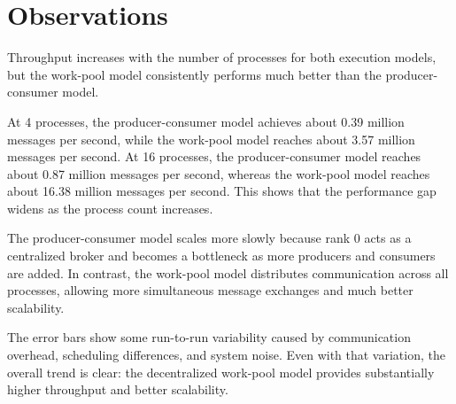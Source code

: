 \documentclass[11pt]{article}
\begin{document}
\section*{Observations}

Throughput increases with the number of processes for both execution models, but the work-pool model consistently performs much better than the producer-consumer model.

At 4 processes, the producer-consumer model achieves about 0.39 million messages per second, while the work-pool model reaches about 3.57 million messages per second. At 16 processes, the producer-consumer model reaches about 0.87 million messages per second, whereas the work-pool model reaches about 16.38 million messages per second. This shows that the performance gap widens as the process count increases.

The producer-consumer model scales more slowly because rank 0 acts as a centralized broker and becomes a bottleneck as more producers and consumers are added. In contrast, the work-pool model distributes communication across all processes, allowing more simultaneous message exchanges and much better scalability.

The error bars show some run-to-run variability caused by communication overhead, scheduling differences, and system noise. Even with that variation, the overall trend is clear: the decentralized work-pool model provides substantially higher throughput and better scalability.
\end{document}
